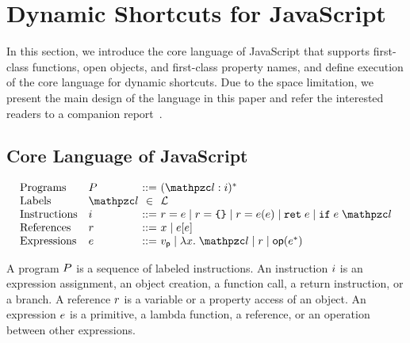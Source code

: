 \section{Dynamic Shortcuts for JavaScript}\label{sec:javascript}
In this section, we introduce the core language of JavaScript that supports
first-class functions, open objects, and first-class property names, and define
{\sealed} execution of the core language for dynamic shortcuts.
Due to the space limitation, we present the main design of the
language in this paper and refer the interested readers to a companion report~\cite{report}.

\subsection{Core Language of JavaScript}

\[
  \begin{array}{ll@{~}c@{~}l}
    \text{Programs} & \prog &::=& (\lab: \inst)^*\\

    \text{Labels} & \lab &\in& \labset\\

    \text{Instructions} & \inst &::=&
    \refer = \expr \mid
    \refer = \kwobj \mid
    \refer = \expr ( \expr ) \mid
    \kwret \; \expr \mid
    \kwif \; \expr \; \lab\\

    \text{References} & \refer &::=&
    x \mid
    \expr [ \expr ]\\

    \text{Expressions} & \expr &::=&
    \pval \mid
    \lambda x. \; \lab \mid
    \refer \mid
    \op(\expr^*)\\
  \end{array}
\]

A program $P$ is a sequence of labeled instructions. An instruction $i$
is an expression assignment, an object creation, a function call, a return
instruction, or a branch.  A reference $r$ is a variable or a property
access of an object.  An expression $e$ is a primitive, a lambda function, a
reference, or an operation between other expressions.

